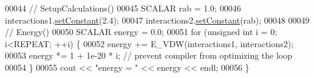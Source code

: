 \begin{DoxyCode}
00044   \textcolor{comment}{// SetupCalculations()}
00045   SCALAR rab = 1.0;  
00046   interactions1.\hyperlink{class_eigen_1_1_plain_object_base_ac8dea1df3d92b752cc683ff42abf6f9b}{setConstant}(2.4);
00047   interactions2.\hyperlink{class_eigen_1_1_plain_object_base_ac8dea1df3d92b752cc683ff42abf6f9b}{setConstant}(rab);
00048   
00049   \textcolor{comment}{// Energy()}
00050   SCALAR energy = 0.0;
00051   \textcolor{keywordflow}{for} (\textcolor{keywordtype}{unsigned} \textcolor{keywordtype}{int} i = 0; i<REPEAT; ++i) \{
00052     energy += E\_VDW(interactions1, interactions2);
00053     energy *= 1 + 1e-20 * i; \textcolor{comment}{// prevent compiler from optimizing the loop}
00054   \}
00055   cout << \textcolor{stringliteral}{"energy = "} << energy << endl;
00056 \}
\end{DoxyCode}
